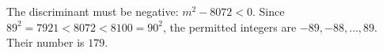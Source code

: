 The discriminant must be negative: $m^2-8072<0$. Since $89^2=7921<8072<8100=90^2$, the permitted integers are $-89,-88,\ldots,89$. Their number is $\boxed{179}$.
